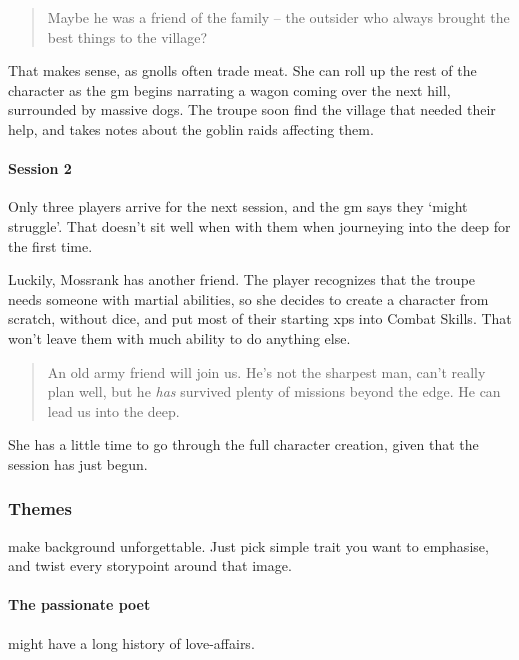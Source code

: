 \begin{multicols}{2}
\begin{exampletext}
  \begin{quotation}
    Maybe he was a friend of the family -- the outsider who always brought the best things to the \gls{village}?
  \end{quotation}

  That makes sense, as gnolls often trade meat.
  She can roll up the rest of the character as the \gls{gm} begins narrating a wagon coming over the next hill, surrounded by massive dogs.
  The troupe soon find the \gls{village} that needed their help, and takes notes about the goblin raids affecting them.

\end{exampletext}

\begin{exampletext}
  \paragraph{Session 2}
  Only three players arrive for the next session, and the \gls{gm} says they `might struggle'.
  That doesn't sit well when with them when journeying into the \gls{deep} for the first time.

  Luckily, Mossrank has another friend.
  The player recognizes that the troupe needs someone with martial abilities, so she decides to create a character from scratch, without dice, and put most of their starting \glspl{xp} into Combat Skills.
  That won't leave them with much ability to do anything else.

  \begin{quotation}
    An old army friend will join us.
    He's not the sharpest man, can't really plan well, but he \emph{has} survived plenty of missions beyond the \gls{edge}.
    He can lead us into the \gls{deep}.
  \end{quotation}

  She has a little time to go through the full character creation, given that the session has just begun.
\end{exampletext}

\subsubsection{Themes}
make  background unforgettable.
Just pick simple trait you want to emphasise, and twist every \gls{storypoint} around that image.

\paragraph{The passionate poet}
might have a long history of love-affairs.


\end{multicols}
